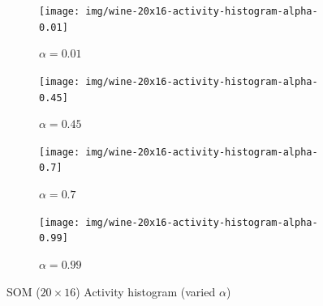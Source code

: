 \documentclass{acm_proc_article-sp}
\begin{document}
\begin{figure}
\centering
    \centering
    \begin{subfigure}[b]{0.24\linewidth}
        \texttt{[image: img/wine-20x16-activity-histogram-alpha-0.01]}
        \caption{$\alpha=0.01$}
        \label{fig:wine-20x16-activity-histogram-alpha-0.01}
    \end{subfigure}
    \begin{subfigure}[b]{0.24\linewidth}
        \texttt{[image: img/wine-20x16-activity-histogram-alpha-0.45]}
        \caption{$\alpha=0.45$}
        \label{fig:wine-20x16-activity-histogram-alpha-0.45}
    \end{subfigure}
    \begin{subfigure}[b]{0.24\linewidth}
        \texttt{[image: img/wine-20x16-activity-histogram-alpha-0.7]}
        \caption{$\alpha=0.7$}
        \label{fig:wine-20x16-activity-histogram-alpha-0.7}
    \end{subfigure}
    \begin{subfigure}[b]{0.24\linewidth}
        \texttt{[image: img/wine-20x16-activity-histogram-alpha-0.99]}
        \caption{$\alpha=0.99$}
        \label{fig:wine-20x16-activity-histogram-alpha-0.99}
    \end{subfigure}
    \caption{SOM ($20\times16$) Activity histogram (varied $\alpha$)}
    \label{fig:wine-20x16-activity-histogram-alpha}
\end{figure}
\end{document}
